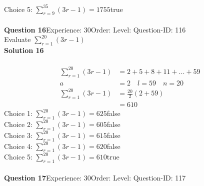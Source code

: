 \documentclass{article}
\begin{document}
Choice 5: \hspace{20pt}$\displaystyle\sum_{r=9}^{35} (3r-1)=1755$\hspace{20pt}true\\
\\[4pt]
\noindent\textbf{Question 16}\hspace{20pt}Experience: 30\hspace{20pt}Order: \hspace{20pt}Level: \hspace{20pt}Question-ID: 116\\[2pt]
Evaluate $\displaystyle\sum_{r=1}^{20} (3r-1)$\\[4pt]
\noindent\textbf{Solution 16}\\[2pt]
\\[-35pt]\begin{align*}
\displaystyle\sum_{r=1}^{20} (3r-1)&=2+5+8+11+...+59\\[2pt]
a&=2\quad l=59 \quad n=20\\[2pt]
\displaystyle\sum_{r=1}^{20} (3r-1)&=\displaystyle\frac{20}{2}(2+59)\\[2pt]
&=610
\end{align*}
Choice 1: \hspace{20pt}$\displaystyle\sum_{r=1}^{20} (3r-1)=625$\hspace{20pt}false\\
Choice 2: \hspace{20pt}$\displaystyle\sum_{r=1}^{20} (3r-1)=605$\hspace{20pt}false\\
Choice 3: \hspace{20pt}$\displaystyle\sum_{r=1}^{20} (3r-1)=615$\hspace{20pt}false\\
Choice 4: \hspace{20pt}$\displaystyle\sum_{r=1}^{20} (3r-1)=620$\hspace{20pt}false\\
Choice 5: \hspace{20pt}$\displaystyle\sum_{r=1}^{20} (3r-1)=610$\hspace{20pt}true\\
\\[4pt]
\noindent\textbf{Question 17}\hspace{20pt}Experience: 30\hspace{20pt}Order: \hspace{20pt}Level: \hspace{20pt}Question-ID: 117\\[2pt]
\end{document}
